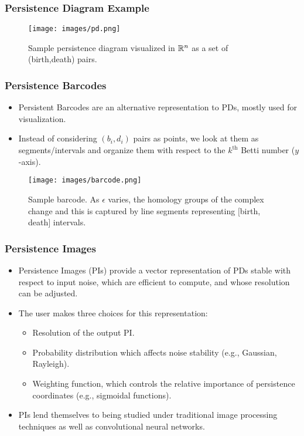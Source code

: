 		\begin{frame}
		\frametitle{Persistence Diagram Example}
		
						\begin{figure}
				\centering
				\texttt{[image: images/pd.png]}
				\caption{Sample persistence diagram visualized in $\mathbb{R}^n$ as a set of (birth,death) pairs.}
		\end{figure}
		\end{frame}
		
		\begin{frame}
		\frametitle{Persistence Barcodes}
		\begin{itemize}
			\item Persistent Barcodes are an alternative representation to PDs, mostly used for visualization.
			\item Instead of considering $(b_i,d_i)$ pairs as points, we look at them as segments/intervals and organize them with respect to the $k^{\text{th}}$ Betti number ($y$-axis).
		\end{itemize}
		
						\begin{figure}
				\centering
				\texttt{[image: images/barcode.png]}
				\caption{Sample barcode. As $\epsilon$ varies, the homology groups of the complex change and this is captured by line segments representing $[$birth, death$]$ intervals.}
		\end{figure}
		
		
		\end{frame}
		
		\begin{frame}
		\frametitle{Persistence Images}
		\begin{itemize}
			\item Persistence Images (PIs) provide a vector representation of PDs stable with respect to input noise, which are efficient to compute, and whose resolution can be adjusted.
			\item The user makes three choices for this representation:
			\begin{itemize}
				\item Resolution of the output PI.
				\item Probability distribution which affects noise stability (e.g., Gaussian, Rayleigh).
				\item Weighting function, which controls the relative importance of persistence coordinates (e.g., sigmoidal functions).
			\end{itemize}
			\item PIs lend themselves to being studied under traditional image processing techniques as well as convolutional neural networks.
		\end{itemize}
		
		\end{frame}
		

